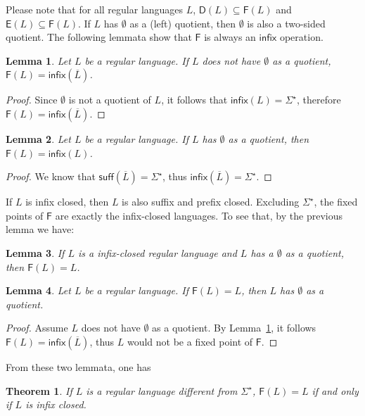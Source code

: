 \documentclass{article}
\newtheorem{lemma}{Lemma}
\newtheorem{theorem}{Theorem}
\newcommand{\comp}[1]{\overline{#1}}
\newcommand{\suff}[1]{\mathsf{suff}(#1)}
\newcommand{\inff}[1]{\mathsf{infix}(#1)}
\newcommand{\inffo}{\mathsf{infix}}
\newcommand{\dis}[1]{\mathsf{D}(#1)}
\newcommand{\dpre}[1]{\mathsf{E}(#1)}
\newcommand{\dinf}[1]{\mathsf{F}(#1)}
\newcommand{\dinfo}{\mathsf{F}}
\begin{document}
Please note that  for all regular languages $L$, $\dis{L}\subseteq \dinf{L}$ and  $\dpre{L}\subseteq \dinf{L}$. 
If $L$ has $\emptyset$ as a (left) quotient, then $\emptyset$ is also a two-sided quotient. 
The following lemmata show that $\dinfo$ is always an $\inffo$ operation.

\begin{lemma}
\label{lem:qinf}
Let $L$ be a regular language. If $L$ does not have $\emptyset$ as a quotient, $\dinf{L}=\inff{\comp{L}}$.
\end{lemma}
\begin{proof} 
Since $\emptyset$ is not a quotient of $L$, it follows that  $\inff{L}=\Sigma^\star$, therefore $\dinf{L}=\inff{\comp{L}}$.
\end{proof}

\begin{lemma}
\label{lem:qeinf}
Let $L$ be a regular language. If $L$ has $\emptyset$ as a  quotient, then  $\dinf{L}=\inff{L}$.
\end{lemma}
\begin{proof}
We know that $\suff{\comp{L}}=\Sigma^\star$, thus $\inff{\comp{L}}=\Sigma^\star$.
\end{proof}


If $L$ is infix closed, then $L$ is also suffix and prefix closed. 
Excluding $\Sigma^\star$, the fixed points of $\dinfo$ are exactly the infix-closed languages. 
To see that, by the previous lemma we have:


\begin{lemma}
\label{lem:inffixpoint}
If $L$ is a infix-closed regular language and  $L$ has a $\emptyset$ as a quotient, then $\dinf{L}=L$.
\end{lemma}

\begin{lemma}
\label{lem:dinfpe}
Let $L$ be a regular language. If  $\dinf{L}=L$, then 
$L$ has $\emptyset$ as a quotient.
 \end{lemma}
\begin{proof}
Assume $L$ does not have $\emptyset$ as a quotient.
By Lemma~\ref{lem:qinf}, it follows  $\dinf{L}=\inff{\comp{L}}$, thus $L$ would not be a fixed point of $\dinfo$.
\end{proof}



From these two lemmata, one has
\begin{theorem}
\label{theo:dinffixpoint}
If $L$ is a regular language different from $\Sigma^\star$, $\dinf{L}=L$ if and only if $L$ is infix closed.
\end{theorem}
\end{document}
